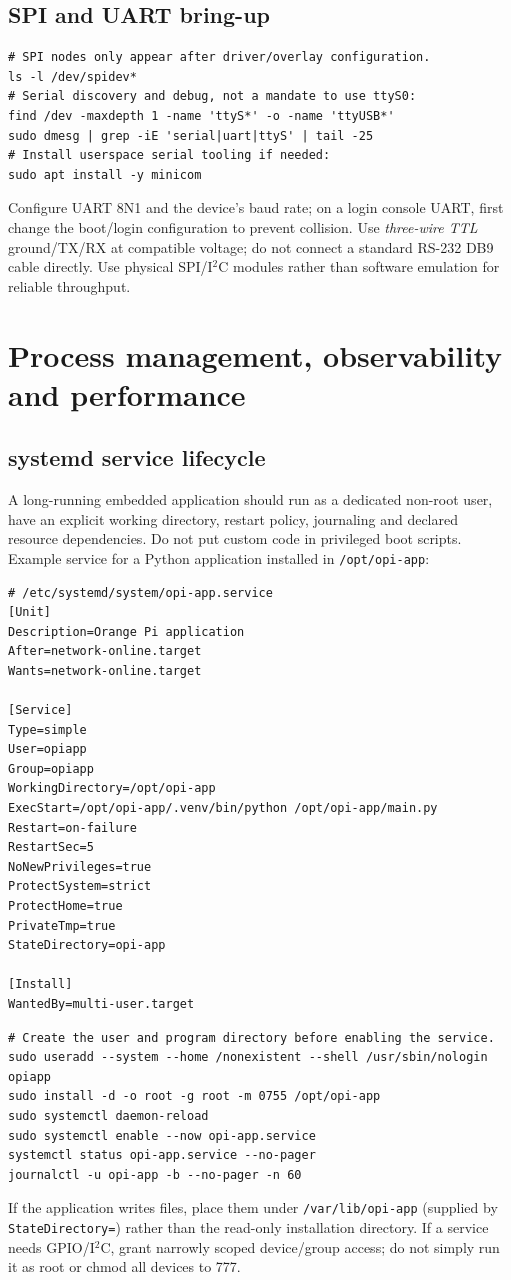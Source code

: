 \documentclass[10pt,oneside,openany]{report}
\newcommand{\code}[1]{\texttt{#1}}
\begin{document}
\section{SPI and UART bring-up}
\begin{lstlisting}[style=sh]
# SPI nodes only appear after driver/overlay configuration.
ls -l /dev/spidev*
# Serial discovery and debug, not a mandate to use ttyS0:
find /dev -maxdepth 1 -name 'ttyS*' -o -name 'ttyUSB*'
sudo dmesg | grep -iE 'serial|uart|ttyS' | tail -25
# Install userspace serial tooling if needed:
sudo apt install -y minicom
\end{lstlisting}
Configure UART 8N1 and the device's baud rate; on a login console UART, first change the boot/login configuration to prevent collision. Use \emph{three-wire TTL} ground/TX/RX at compatible voltage; do not connect a standard RS-232 DB9 cable directly. Use physical SPI/I\(^{2}\)C modules rather than software emulation for reliable throughput.

\chapter{Process management, observability and performance}
\section{systemd service lifecycle}
A long-running embedded application should run as a dedicated non-root user, have an explicit working directory, restart policy, journaling and declared resource dependencies. Do not put custom code in privileged boot scripts. Example service for a Python application installed in \code{/opt/opi-app}:
\begin{lstlisting}[style=config]
# /etc/systemd/system/opi-app.service
[Unit]
Description=Orange Pi application
After=network-online.target
Wants=network-online.target

[Service]
Type=simple
User=opiapp
Group=opiapp
WorkingDirectory=/opt/opi-app
ExecStart=/opt/opi-app/.venv/bin/python /opt/opi-app/main.py
Restart=on-failure
RestartSec=5
NoNewPrivileges=true
ProtectSystem=strict
ProtectHome=true
PrivateTmp=true
StateDirectory=opi-app

[Install]
WantedBy=multi-user.target
\end{lstlisting}
\begin{lstlisting}[style=sh]
# Create the user and program directory before enabling the service.
sudo useradd --system --home /nonexistent --shell /usr/sbin/nologin opiapp
sudo install -d -o root -g root -m 0755 /opt/opi-app
sudo systemctl daemon-reload
sudo systemctl enable --now opi-app.service
systemctl status opi-app.service --no-pager
journalctl -u opi-app -b --no-pager -n 60
\end{lstlisting}
If the application writes files, place them under \code{/var/lib/opi-app} (supplied by \code{StateDirectory=}) rather than the read-only installation directory. If a service needs GPIO/I\(^{2}\)C, grant narrowly scoped device/group access; do not simply run it as root or chmod all devices to 777.
\end{document}
